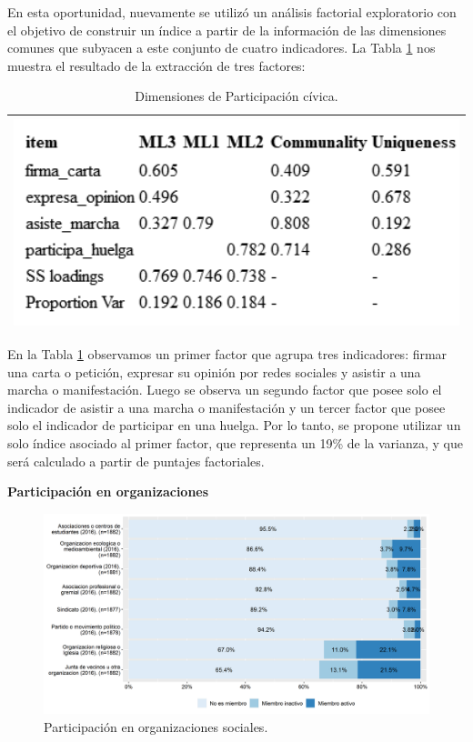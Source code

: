 \documentclass[
  12pt,
]{book}
\begin{document}
En esta oportunidad, nuevamente se utilizó un análisis factorial exploratorio con el objetivo de construir un índice a partir de la información de las dimensiones comunes que subyacen a este conjunto de cuatro indicadores. La Tabla \ref{tab:part-civica-fa} nos muestra el resultado de la extracción de tres factores:

\begin{longtable}[]{@{}l@{}}
\caption{\label{tab:part-civica-fa}Dimensiones de Participación cívica.}\tabularnewline
\toprule
\endhead
\includegraphics[width=5.20833in,height=\textheight]{output/tables/part_civica_fa.png} \\
\bottomrule
\end{longtable}

En la Tabla \ref{tab:part-civica-fa} observamos un primer factor que agrupa tres indicadores: firmar una carta o petición, expresar su opinión por redes sociales y asistir a una marcha o manifestación. Luego se observa un segundo factor que posee solo el indicador de asistir a una marcha o manifestación y un tercer factor que posee solo el indicador de participar en una huelga. Por lo tanto, se propone utilizar un solo índice asociado al primer factor, que representa un 19\% de la varianza, y que será calculado a partir de puntajes factoriales.

\textbf{Participación en organizaciones}

\begin{figure}[H]

{\centering \includegraphics[width=1\linewidth,height=1\textheight]{output/graphs/participacion-organizaciones} 

}

\caption{Participación en organizaciones sociales.}\label{fig:participacion-organizaciones}
\end{figure}
\end{document}
